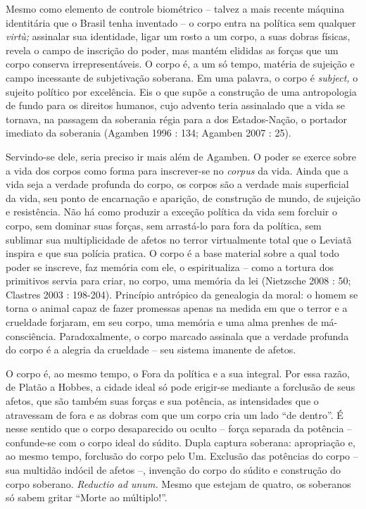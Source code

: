 Mesmo como elemento de controle biométrico -- talvez a mais recente
máquina identitária que o Brasil tenha inventado -- o corpo entra na
política sem qualquer \emph{virtù; }assinalar sua identidade, ligar um
rosto a um corpo, a suas dobras físicas, revela o campo de inscrição do
poder, mas mantém elididas as forças que um corpo conserva
irrepresentáveis. O corpo é, a um só tempo, matéria de sujeição e campo
incessante de subjetivação soberana. Em uma palavra, o corpo é
\emph{subject,} o sujeito político por excelência. Eis o que supõe a
construção de uma antropologia de fundo para os direitos humanos, cujo
advento teria assinalado que a vida se tornava, na passagem da soberania
régia para a dos Estados-Nação, o portador imediato da soberania
(Agamben 1996 : 134; Agamben 2007 : 25).

Servindo-se dele, seria preciso ir mais além de Agamben. O poder se
exerce sobre a vida dos corpos como forma para inscrever-se no
\emph{corpus }da vida. Ainda que a vida seja a verdade profunda do
corpo, os corpos são a verdade mais superficial da vida, seu ponto de
encarnação e aparição, de construção de mundo, de sujeição e
resistência. Não há como produzir a exceção política da vida sem
forcluir o corpo, sem dominar suas forças, sem arrastá-lo para fora da
política, sem sublimar sua multiplicidade de afetos no terror
virtualmente total que o Leviatã inspira e que sua polícia pratica. O
corpo é a base material sobre a qual todo poder se inscreve, faz memória
com ele, o espiritualiza -- como a tortura dos primitivos servia para
criar, no corpo, uma memória da lei (Nietzsche 2008 : 50; Clastres 2003
: 198-204). Princípio antrópico da genealogia da moral: o homem se torna
o animal capaz de fazer promessas apenas na medida em que o terror e a
crueldade forjaram, em seu corpo, uma memória e uma alma prenhes de
má-consciência. Paradoxalmente, o corpo marcado assinala que a verdade
profunda do corpo é a alegria da crueldade -- seu sistema imanente de
afetos.

O corpo é, ao mesmo tempo, o Fora da política e a sua integral. Por essa
razão, de Platão a Hobbes, a cidade ideal só pode erigir-se mediante a
forclusão de seus afetos, que são também suas forças e sua potência, as
intensidades que o atravessam de fora e as dobras com que um corpo cria
um lado ``de dentro''. É nesse sentido que o corpo desaparecido ou
oculto -- força separada da potência -- confunde-se com o corpo ideal do
súdito. Dupla captura soberana: apropriação e, ao mesmo tempo, forclusão
do corpo pelo Um. Exclusão das potências do corpo -- sua multidão
indócil de afetos --, invenção do corpo do súdito e construção do corpo
soberano. \emph{Reductio ad unum. }Mesmo que estejam de quatro, os
soberanos só sabem gritar ``Morte ao múltiplo!''.

